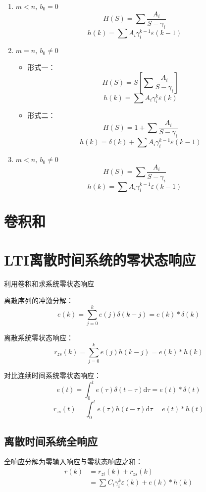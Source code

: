 \documentclass[UTF8]{ctexart}
\begin{document}
\begin{enumerate}
    \item $m<n,\ b_{0}=0$
    $$
    H(S)=\sum \frac{A_{i}}{S-\gamma_{i}}
    $$
    $$
    h(k)=\sum A_{i} \gamma_{i}^{k-1} \varepsilon(k-1)
    $$
    
    \item $m=n,\ b_{0} \neq 0$
    \begin{itemize}
        \item 形式一：
        $$
        H(S)=S\left[\sum \frac{A_{i}}{S-\gamma_{i}}\right]
        $$
        $$
        h(k)=\sum A_{i} \gamma_{i}^{k} \varepsilon(k)
        $$
        \item 形式二：
        $$
        H(S)=1+\sum \frac{A_{i}}{S-\gamma_{i}}
        $$
        $$
        h(k)=\delta(k)+\sum A_{i} \gamma_{i}^{k-1} \varepsilon(k-1)
        $$
    \end{itemize}
    
    \item $m<n,\ b_{0} \neq 0$
    $$
    H(S)=\sum \frac{A_{i}}{S-\gamma_{i}}
    $$
    $$
    h(k)=\sum A_{i} \gamma_{i}^{k-1} \varepsilon(k-1)
    $$
\end{enumerate}

\section{卷积和}

\section{LTI离散时间系统的零状态响应}

利用卷积和求系统零状态响应

离散序列的冲激分解：
$$
e(k)=\sum_{j=0}^{k} e(j) \delta(k-j)=e(k) * \delta(k)
$$

离散系统零状态响应：
$$
r_{zs}(k)=\sum_{j=0}^{k} e(j) h(k-j)=e(k) * h(k)
$$

对比连续时间系统零状态响应：
$$
e(t)=\int_{0}^{t} e(\tau) \delta(t-\tau) \mathrm{d}\tau=e(t) * \delta(t)
$$
$$
r_{zs}(t)=\int_{0}^{t} e(\tau) h(t-\tau) \mathrm{d}\tau=e(t) * h(t)
$$

\subsection{离散时间系统全响应}

全响应分解为零输入响应与零状态响应之和：
$$
\begin{aligned}
r(k) & =r_{zi}(k)+r_{zs}(k) \\
& =\sum C_{i} \gamma_{i}^{k} \varepsilon(k)+e(k) * h(k)
\end{aligned}
$$
\end{document}
